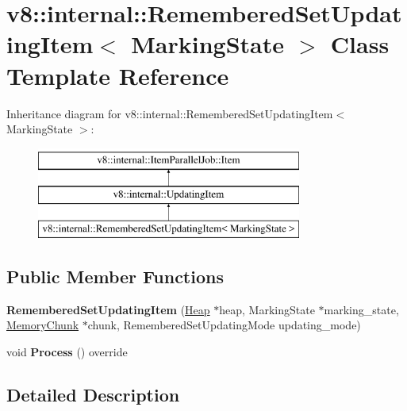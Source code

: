 \hypertarget{classv8_1_1internal_1_1RememberedSetUpdatingItem}{}\section{v8\+:\+:internal\+:\+:Remembered\+Set\+Updating\+Item$<$ Marking\+State $>$ Class Template Reference}
\label{classv8_1_1internal_1_1RememberedSetUpdatingItem}
Inheritance diagram for v8\+:\+:internal\+:\+:Remembered\+Set\+Updating\+Item$<$ Marking\+State $>$\+:\begin{figure}[H]
\begin{center}
\leavevmode
\includegraphics[height=3.000000cm]{classv8_1_1internal_1_1RememberedSetUpdatingItem}
\end{center}
\end{figure}
\subsection*{Public Member Functions}
\begin{DoxyCompactItemize}
\item 
\mbox{\label{classv8_1_1internal_1_1RememberedSetUpdatingItem_a2bd21b72cb0591f7c14ea4050a7a238d}} 
{\bfseries Remembered\+Set\+Updating\+Item} (\mbox{\hyperlink{classv8_1_1internal_1_1Heap}{Heap}} $\ast$heap, Marking\+State $\ast$marking\+\_\+state, \mbox{\hyperlink{classv8_1_1internal_1_1MemoryChunk}{Memory\+Chunk}} $\ast$chunk, Remembered\+Set\+Updating\+Mode updating\+\_\+mode)
\item 
\mbox{\label{classv8_1_1internal_1_1RememberedSetUpdatingItem_a8b5699f270997fe276675d168cc15ac9}} 
void {\bfseries Process} () override
\end{DoxyCompactItemize}


\subsection{Detailed Description}
